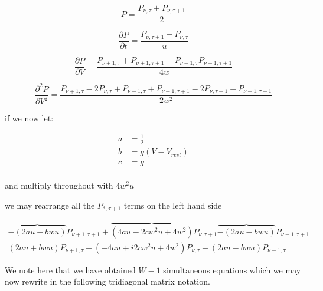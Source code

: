 \documentclass[10pt]{article}
\begin{document}
\begin{equation}
    P = \frac{P_{\nu,\tau} + P_{\nu,\tau + 1}}{2}
\end{equation}

\begin{equation}
    \frac{\partial P}{\partial t} = \frac{P_{\nu,\tau +1 } -
    P_{\nu,\tau}}{u}
\end{equation}

\begin{equation}
    \frac{\partial P}{\partial V} = 
    \frac{P_{\nu +1,\tau } + P_{\nu +1,\tau +1 } -
    P_{\nu - 1,\tau } P_{\nu -1,\tau +1}}
    {4w}
\end{equation}

\begin{equation}
    \frac{\partial^2 P}{\partial V^2} = 
    \frac{P_{\nu+1,\tau} - 2 P_{\nu,\tau} + P_{\nu-1,\tau} +
    P_{\nu+1,\tau+1} - 2 P_{\nu,\tau+1} + P_{\nu-1,\tau+1}}
    {2w^2}
\end{equation}

if we now let:

\begin{align*}
a &= \frac{1}{2} \\
b &= g(V - V_{rest}) \\
c &= g \\
\end{align*}

and multiply throughout with $4w^2u$

we may rearrange all the $P_{*,\tau+1} $ terms on the left hand side

\begin{multline}
    \overbrace{-(2au+bwu)} P_{\nu+1,\tau+1} + 
    \overbrace{(4au - 2cw^2u + 4w^2)} P_{\nu,\tau+1} 
    \overbrace{-(2au-bwu)} P_{\nu-1,\tau+1} 
    =  \\
    (2au+bwu) P_{\nu+1,\tau} +  
    (-4au +i  2cw^2u + 4w^2) P_{\nu,\tau} + 
    (2au-bwu) P_{\nu-1,\tau} 
\end{multline}

We note here that we have obtained $W-1$ simultaneous equations which
we may now rewrite in the following tridiagonal matrix notation.
\end{document}
